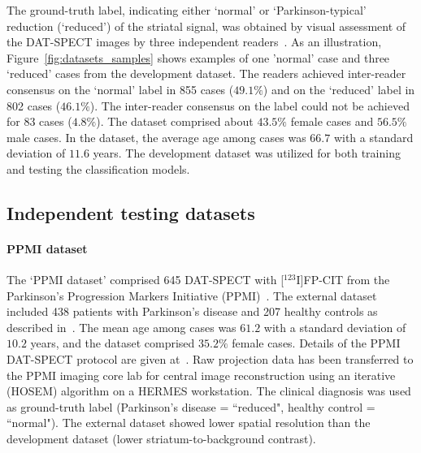 The ground-truth label, indicating either `normal' or `Parkinson-typical' reduction (`reduced') of the striatal signal, 
was obtained by visual assessment of the DAT-SPECT images by three independent readers~\citep{Schiebler2023}.
As an illustration, Figure~\ref{fig:datasets_samples} shows examples of one 'normal' case and three `reduced' cases 
from the development dataset. 
The readers achieved inter-reader consensus on the `normal' label in 855 cases ($49.1\%$)
and on the `reduced' label in 802 cases ($46.1\%$).
The inter-reader consensus on the label could not be achieved for 83 cases ($4.8\%$).
The dataset comprised about $43.5\%$ female cases and $56.5\%$ male cases.
In the dataset, the average age among cases was $66.7$ with a standard deviation of $11.6$ years.
The development dataset was utilized for both training and testing the classification models. 

\subsection{Independent testing datasets}
\label{subsec:external_dataset}

\paragraph{PPMI dataset}
The `PPMI dataset' comprised 645 DAT-SPECT with [$^{123}$I]FP-CIT from the 
Parkinson's Progression Markers Initiative (PPMI)~\citep{Parkinson_Progression_Marker_Initiative2011-px}.
The external dataset included 438 patients with Parkinson's disease and 207 healthy controls as described in~\cite{Wenzel2019}.
The mean age among cases was $61.2$ with a standard deviation of $10.2$ years, 
and the dataset comprised $35.2\%$ female cases.
Details of the PPMI DAT-SPECT protocol are given at~\cite{ppmi_datspect_prot}. 
Raw projection data has been transferred to the PPMI imaging core lab for central image reconstruction using an iterative (HOSEM) algorithm on a HERMES workstation. 
The clinical diagnosis was used as ground-truth label (Parkinson's disease = ``reduced", healthy control = ``normal"). 
The external dataset showed lower spatial resolution than the development dataset (lower striatum-to-background contrast).

